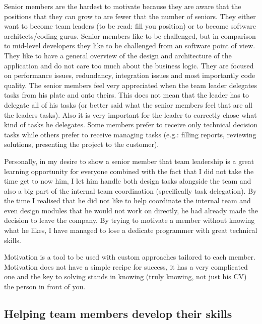 Senior members are the hardest to motivate because they are aware that the positions that they can grow to are fewer that the number of seniors. They either want to become team leaders (to be read: fill you position) or to become software architects/coding gurus. Senior members like to be challenged, but in comparison to mid-level developers they like to be challenged from an software point of view. They like to have a general overview of the design and architecture of the application and do not care too much about the business logic. They are focused on performance issues, redundancy, integration issues and most importantly code quality. The senior members feel very appreciated when the team leader delegates tasks from his plate and onto theirs. This does not mean that the leader has to delegate all of his tasks (or better said what the senior members feel that are all the leaders tasks). Also it is very important for the leader to correctly chose what kind of tasks he delegates. Some members prefer to receive only technical decision tasks while others prefer to receive managing tasks (e.g.: filling reports, reviewing solutions, presenting the project to the customer).

Personally, in my desire to show a senior member that team leadership is a great learning opportunity for everyone combined with the fact that I did not take the time get to now him, I let him handle both design tasks alongside the team and also a big part of the internal team coordination (specifically task delegation). By the time I realised that he did not like to help coordinate the internal team and even design modules that he would not work on directly, he had already made the decision to leave the company. By trying to motivate a member without knowing what he likes, I have managed to lose a dedicate programmer with great technical skills.

Motivation is a tool to be used with custom approaches tailored to each member. Motivation does not have a simple recipe for success, it has a very complicated one and the key to solving stands in knowing (truly knowing, not just his CV) the person in front of you.

\subsection{Helping team members develop their skills}

